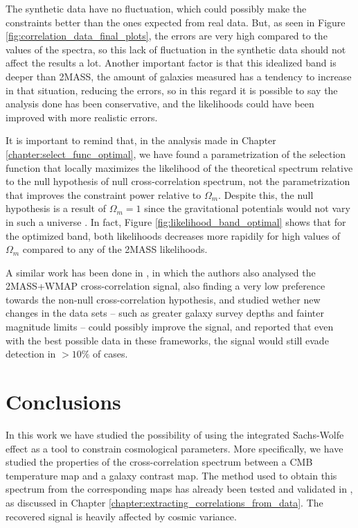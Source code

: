 \documentclass[openany,a4paper,12pt,oneside]{book}
\begin{document}
\begin{spacing}{1.5}
The synthetic data have no fluctuation, which could possibly make the constraints better than the ones expected from real data. But, as seen in Figure \ref{fig:correlation_data_final_plots}, the errors are very high compared to the values of the spectra, so this lack of fluctuation in the synthetic data should not affect the results a lot. Another important factor is that this idealized band is deeper than 2MASS, the amount of galaxies measured has a tendency to increase in that situation, reducing the errors, so in this regard it is possible to say the analysis done has been conservative, and the likelihoods could have been improved with more realistic errors.

It is important to remind that, in the analysis made in Chapter \ref{chapter:select_func_optimal}, we have found a parametrization of the selection function that locally maximizes the likelihood of the theoretical spectrum relative to the null hypothesis of null cross-correlation spectrum, not the parametrization that improves the constraint power relative to $\Omega_m$. Despite this, the null hypothesis is a result of $\Omega_m=1$ since the gravitational potentials would not vary in such a universe \cite{ronaldo_inhDE}. In fact, Figure \ref{fig:likelihood_band_optimal} shows that for the optimized band, both likelihoods decreases more rapidily for high values of $\Omega_m$ compared to any of the 2MASS likelihoods.

A similar work has been done in \cite{simillar_ISW_analysis}, in which the authors also analysed the 2MASS+WMAP cross-correlation signal, also finding a very low preference towards the non-null cross-correlation hypothesis, and studied wether new changes in the data sets -- such as greater galaxy survey depths and fainter magnitude limits -- could possibly improve the signal, and reported that even with the best possible data in these frameworks, the signal would still evade detection in $>10\%$ of cases.

\chapter{Conclusions}\label{chapter:conclusions}

In this work we have studied the possibility of using the integrated Sachs-Wolfe effect as a tool to constrain cosmological parameters. More specifically, we have studied the properties of the cross-correlation spectrum between a CMB temperature map and a galaxy contrast map. The method used to obtain this spectrum from the corresponding maps has already been tested and validated in \cite{Moura-Santos_2016}, as discussed in Chapter \ref{chapter:extracting_correlations_from_data}. The recovered signal is heavily affected by cosmic variance.


\end{spacing}
\end{document}
